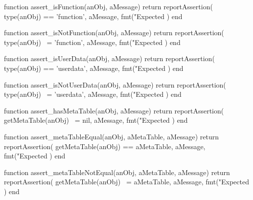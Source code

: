 \stopTestSuite

\startTestSuite[title=assert_isFunction]

\startLuaCode
function assert_isFunction(anObj, aMessage)
  return reportAssertion(
    type(anObj) == 'function',
    aMessage,
    fmt("Expected %
  )
end
\stopLuaCode

\stopTestSuite

\startTestSuite[title=assert_isNotFunction]

\startLuaCode
function assert_isNotFunction(anObj, aMessage)
  return reportAssertion(
    type(anObj) ~= 'function',
    aMessage,
    fmt("Expected %
  )
end
\stopLuaCode

\stopTestSuite

\startTestSuite[title=assert_isUserData]

\startLuaCode
function assert_isUserData(anObj, aMessage)
  return reportAssertion(
    type(anObj) == 'userdata',
    aMessage,
    fmt("Expected %
  )
end
\stopLuaCode

\stopTestSuite

\startTestSuite[title=assert_isNotUserData]

\startLuaCode
function assert_isNotUserData(anObj, aMessage)
  return reportAssertion(
    type(anObj) ~= 'userdata',
    aMessage,
    fmt("Expected %
  )
end
\stopLuaCode

\stopTestSuite

\startTestSuite[title=assert_hasMetaTable]

\startLuaCode
function assert_hasMetaTable(anObj, aMessage)
  return reportAssertion(
    getMetaTable(anObj) ~= nil,
    aMessage,
    fmt("Expected %
  )
end
\stopLuaCode

\stopTestSuite

\startTestSuite[title=assert_metaTableEquals]

\startLuaCode
function assert_metaTableEqual(anObj, aMetaTable, aMessage)
  return reportAssertion(
    getMetaTable(anObj) == aMetaTable,
    aMessage,
    fmt("Expected %
  )
end
\stopLuaCode

\stopTestSuite

\startTestSuite[title=assert_metaTableNotEqual]

\startLuaCode
function assert_metaTableNotEqual(anObj, aMetaTable, aMessage)
  return reportAssertion(
    getMetaTable(anObj) ~= aMetaTable,
    aMessage,
    fmt("Expected %
  )
end
\stopLuaCode

